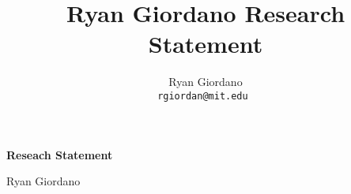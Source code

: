 
\usepackage{enumitem}

\title{Ryan Giordano Research Statement}

\author{
  Ryan Giordano \\ \texttt{rgiordan@mit.edu }
}




\begin{minipage}[t]{0.5\textwidth}
\hspace{-2em} %
{\bf \LARGE Reseach Statement}\\
\end{minipage}
\begin{minipage}[t]{0.5\textwidth}
        \hspace{4.5em} %
        {\LARGE Ryan Giordano}
\end{minipage}

